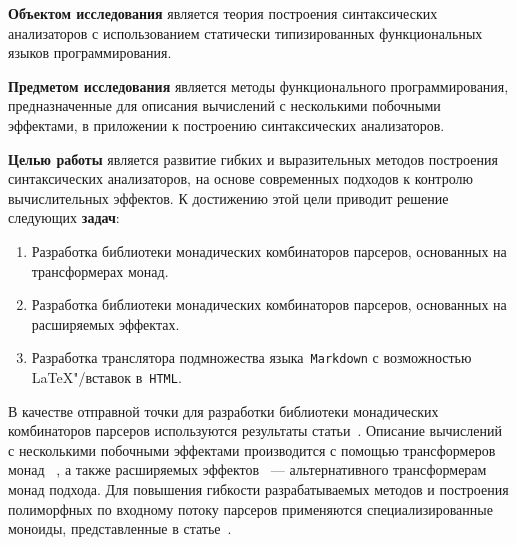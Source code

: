 \textbf{Объектом исследования} является теория построения синтаксических анализаторов 
с использованием статически типизированных функциональных языков программирования.  

\textbf{Предметом исследования} является методы функционального программирования, 
предназначенные для описания вычислений с несколькими побочными эффектами, 
в приложении к построению синтаксических анализаторов.  

\textbf{Целью работы} является развитие гибких и выразительных методов построения 
синтаксических анализаторов, на основе современных подходов к контролю вычислительных
эффектов.
К достижению этой цели приводит решение следующих \textbf{задач}:
\begin{enumerate}
  \item Разработка библиотеки монадических комбинаторов парсеров, основанных на 
  трансформерах монад.
  \item Разработка библиотеки монадических комбинаторов парсеров, основанных на 
  расширяемых эффектах.
  \item Разработка транслятора подмножества языка~\lstinline{Markdown} с возможностью
  \LaTeX"/вставок в~\lstinline{HTML}.
\end{enumerate}  

В качестве отправной точки для разработки библиотеки монадических комбинаторов
парсеров используются результаты статьи~\cite{monParsing}. Описание вычислений
с несколькими побочными эффектами производится с помощью трансформеров монад
~\cite{monadTransformers}, а также расширяемых эффектов~\cite{extEffects} ---
альтернативного трансформерам монад подхода. Для повышения гибкости разрабатываемых 
методов и построения полиморфных по входному потоку парсеров применяются 
специализированные моноиды, представленные в статье~\cite{monoids}.
